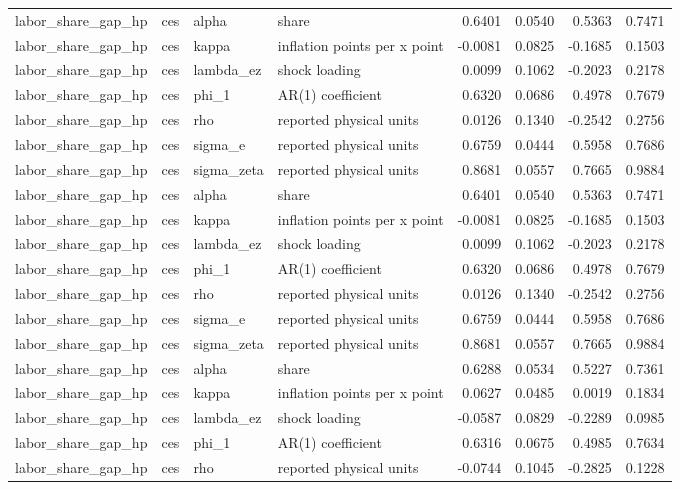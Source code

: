 \begin{tabular}{llllrrrr}
labor\_share\_gap\_hp & ces & alpha & share & 0.6401 & 0.0540 & 0.5363 & 0.7471 \\
labor\_share\_gap\_hp & ces & kappa & inflation points per x point & -0.0081 & 0.0825 & -0.1685 & 0.1503 \\
labor\_share\_gap\_hp & ces & lambda\_ez & shock loading & 0.0099 & 0.1062 & -0.2023 & 0.2178 \\
labor\_share\_gap\_hp & ces & phi\_1 & AR(1) coefficient & 0.6320 & 0.0686 & 0.4978 & 0.7679 \\
labor\_share\_gap\_hp & ces & rho & reported physical units & 0.0126 & 0.1340 & -0.2542 & 0.2756 \\
labor\_share\_gap\_hp & ces & sigma\_e & reported physical units & 0.6759 & 0.0444 & 0.5958 & 0.7686 \\
labor\_share\_gap\_hp & ces & sigma\_zeta & reported physical units & 0.8681 & 0.0557 & 0.7665 & 0.9884 \\
labor\_share\_gap\_hp & ces & alpha & share & 0.6401 & 0.0540 & 0.5363 & 0.7471 \\
labor\_share\_gap\_hp & ces & kappa & inflation points per x point & -0.0081 & 0.0825 & -0.1685 & 0.1503 \\
labor\_share\_gap\_hp & ces & lambda\_ez & shock loading & 0.0099 & 0.1062 & -0.2023 & 0.2178 \\
labor\_share\_gap\_hp & ces & phi\_1 & AR(1) coefficient & 0.6320 & 0.0686 & 0.4978 & 0.7679 \\
labor\_share\_gap\_hp & ces & rho & reported physical units & 0.0126 & 0.1340 & -0.2542 & 0.2756 \\
labor\_share\_gap\_hp & ces & sigma\_e & reported physical units & 0.6759 & 0.0444 & 0.5958 & 0.7686 \\
labor\_share\_gap\_hp & ces & sigma\_zeta & reported physical units & 0.8681 & 0.0557 & 0.7665 & 0.9884 \\
labor\_share\_gap\_hp & ces & alpha & share & 0.6288 & 0.0534 & 0.5227 & 0.7361 \\
labor\_share\_gap\_hp & ces & kappa & inflation points per x point & 0.0627 & 0.0485 & 0.0019 & 0.1834 \\
labor\_share\_gap\_hp & ces & lambda\_ez & shock loading & -0.0587 & 0.0829 & -0.2289 & 0.0985 \\
labor\_share\_gap\_hp & ces & phi\_1 & AR(1) coefficient & 0.6316 & 0.0675 & 0.4985 & 0.7634 \\
labor\_share\_gap\_hp & ces & rho & reported physical units & -0.0744 & 0.1045 & -0.2825 & 0.1228 \\

\end{tabular}
